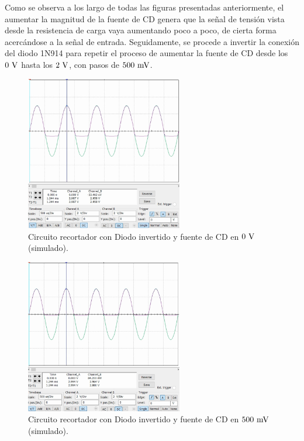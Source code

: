 \documentclass[journal]{IEEEtran}
\begin{document}
Como se observa a los largo de todas las figuras presentadas anteriormente, el aumentar la magnitud de la fuente de CD
genera que la señal de tensión vista desde la resistencia de carga vaya aumentando poco a poco, de cierta forma acercándose 
a la señal de entrada. Seguidamente, se procede a invertir la conexión del diodo 1N914 para repetir el proceso de aumentar 
la fuente de CD desde los $0~\textnormal{V}$ hasta los $2~\textnormal{V}$, con pasos de $500~\textnormal{mV}$.
\begin{figure}[H]
        \centering
        \includegraphics[width=2.7in]{SignalSimulated_10.png}
        \caption{Circuito recortador con Diodo invertido y fuente de CD en $0~\textnormal{V}$ (simulado).}
        \label{fig:SignalSimulated_10}
\end{figure}
\vspace{-0.6cm}
\begin{figure}[H]
        \centering
        \includegraphics[width=2.7in]{SignalSimulated_11.png}
        \caption{Circuito recortador con Diodo invertido y fuente de CD en $500~\textnormal{mV}$ (simulado).}
        \label{fig:SignalSimulated_11}
\end{figure}
\end{document}
